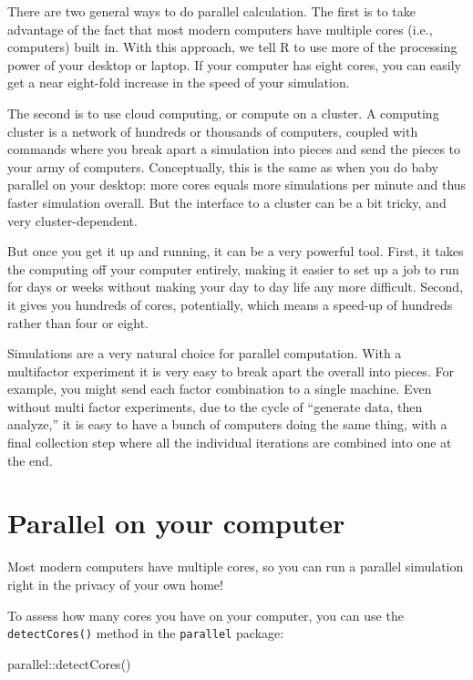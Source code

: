 \documentclass[
]{book}
\newenvironment{Shaded}{\begin{snugshade}}{\end{snugshade}}
\newcommand{\FunctionTok}[1]{\textcolor[rgb]{0.00,0.00,0.00}{#1}}
\newcommand{\NormalTok}[1]{#1}
\newcommand{\SpecialCharTok}[1]{\textcolor[rgb]{0.00,0.00,0.00}{#1}}
\begin{document}
There are two general ways to do parallel calculation.
The first is to take advantage of the fact that most modern computers have multiple cores (i.e., computers) built in.
With this approach, we tell R to use more of the processing power of your desktop or laptop.
If your computer has eight cores, you can easily get a near eight-fold increase in the speed of your simulation.

The second is to use cloud computing, or compute on a cluster.
A computing cluster is a network of hundreds or thousands of computers, coupled with commands where you break apart a simulation into pieces and send the pieces to your army of computers.
Conceptually, this is the same as when you do baby parallel on your desktop: more cores equals more simulations per minute and thus faster simulation overall.
But the interface to a cluster can be a bit tricky, and very cluster-dependent.

But once you get it up and running, it can be a very powerful tool.
First, it takes the computing off your computer entirely, making it easier to set up a job to run for days or weeks without making your day to day life any more difficult.
Second, it gives you hundreds of cores, potentially, which means a speed-up of hundreds rather than four or eight.

Simulations are a very natural choice for parallel computation.
With a multifactor experiment it is very easy to break apart the overall into pieces.
For example, you might send each factor combination to a single machine.
Even without multi factor experiments, due to the cycle of ``generate data, then analyze,'' it is easy to have a bunch of computers doing the same thing, with a final collection step where all the individual iterations are combined into one at the end.

\hypertarget{parallel-on-your-computer}{%
\section{Parallel on your computer}\label{parallel-on-your-computer}}

Most modern computers have multiple cores, so you can run a parallel simulation right in the privacy of your own home!

To assess how many cores you have on your computer, you can use the \texttt{detectCores()} method in the \texttt{parallel} package:

\begin{Shaded}
\begin{Highlighting}[]
\NormalTok{parallel}\SpecialCharTok{::}\FunctionTok{detectCores}\NormalTok{()}
\end{Highlighting}
\end{Shaded}
\end{document}
